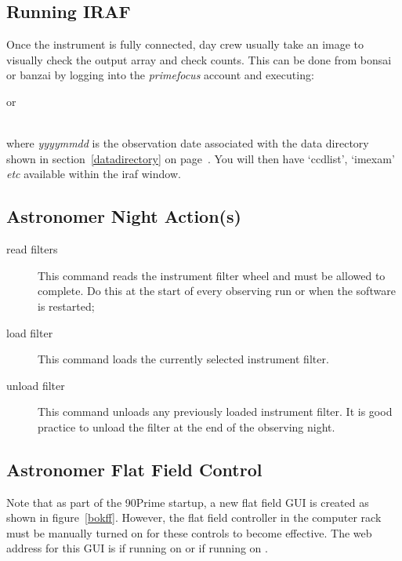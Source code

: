 \documentclass[12pt,twoside]{article}
\begin{document}
\subsection{Running IRAF}
\label{Running IRAF}
Once the instrument is fully connected, day crew usually take an image to visually check the output array and check counts. This can be done
from {\sfmagenta bonsai} or {\sfmagenta banzai} by logging into the \emph{primefocus} account and executing: \\



\noindent or

 \\

where \emph{yyyymmdd} is the observation date associated with the data directory shown in section~\ref{datadirectory} on page~\pageref{datadirectory}. You will then have `ccdlist', `imexam' \emph{etc} available within the iraf window.

\subsection{Astronomer Night Action(s)}
\label{astronomernightactions}

\begin{description}
 \item[{\sc read filters}] This command reads the instrument filter wheel and must be allowed to complete. 
Do this at the start of every observing run or when the software is restarted;
 \item[{\sc load filter}] This command loads the currently selected instrument filter.
 \item[{\sc unload filter}] This command unloads any previously loaded instrument filter. 
It is good practice to unload the filter at the end of the observing night.
\end{description}

\subsection{Astronomer Flat Field Control}
\label{astronomerflatfieldcontrol}
Note that as part of the 90Prime startup, a new flat field GUI is created as shown in figure~\ref{bokff}. However, the
flat field controller in the computer rack must be manually turned on for these controls to become effective. The web
address for this GUI is  if running on  or  if running on .
\end{document}
